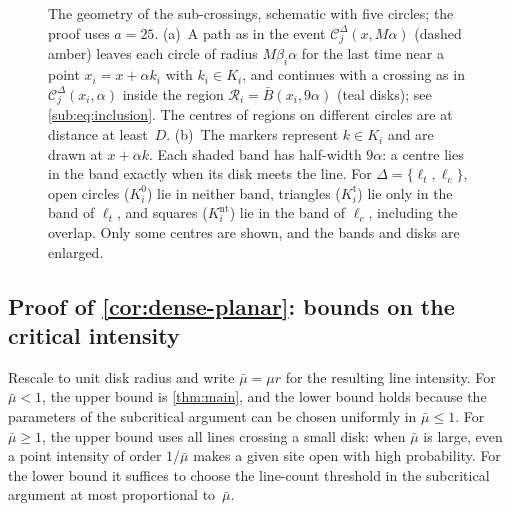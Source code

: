 \documentclass[11pt,letterpaper]{article}
\newcommand{\cC}{\mathcal C}
\begin{document}
\begin{figure}[ht]
  \centering
  
  \caption{The geometry of the sub-crossings, schematic with five circles; the proof uses $a=25$. (a)~A path as in the event $\cC_j^{\Delta}(x,M\alpha)$ (dashed amber) leaves each circle of radius $M\beta_i\alpha$ for the last time near a point $x_i=x+\alpha k_i$ with $k_i\in K_i$, and continues with a crossing as in $\cC_j^{\Delta}(x_i,\alpha)$ inside the region $\mathcal R_i=\bar B(x_i,9\alpha)$ (teal disks); see \eqref{sub:eq:inclusion}. The centres of regions on different circles are at distance at least~$D$. (b)~The markers represent $k\in K_i$ and are drawn at $x+\alpha k$. Each shaded band has half-width $9\alpha$: a centre lies in the band exactly when its disk meets the line. For $\Delta=\{\ell_t,\ell_c\}$, open circles ($K_i^{0}$) lie in neither band, triangles ($K_i^{\mathrm{t}}$) lie only in the band of $\ell_t$, and squares ($K_i^{\mathrm{nt}}$) lie in the band of $\ell_c$, including the overlap. Only some centres are shown, and the bands and disks are enlarged.}
  \label{fig:subcrossings}
\end{figure}

\subsection{Proof of \texorpdfstring{\cref{cor:dense-planar}}{the two-sided bounds}: bounds on the critical intensity}
\label{sec:dense-planar}

Rescale to unit disk radius and write $\bar\mu=\mu r$ for the resulting line intensity. For $\bar\mu<1$, the upper bound is \cref{thm:main}, and the lower bound holds because the parameters of the subcritical argument can be chosen uniformly in $\bar\mu\le1$. For $\bar\mu\ge1$, the upper bound uses all lines crossing a small disk: when $\bar\mu$ is large, even a point intensity of order $1/\bar\mu$ makes a given site open with high probability. For the lower bound it suffices to choose the line-count threshold in the subcritical argument at most proportional to~$\bar\mu$.
\end{document}
